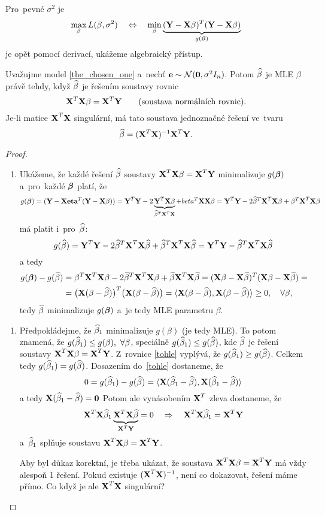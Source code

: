  Pro~pevné $\sigma^2$ je 
 $$\max_\beta L(\beta,\sigma^2)\quad\Leftrightarrow\quad\min_\beta\underbrace{(\textbf{Y}-\textbf{X}\beta)^T(\textbf{Y}-\textbf{X}\beta)}_{g(\boldsymbol{\beta})}$$
 je opět pomocí derivací, ukážeme algebraický přístup.
 
 \begin{theorem}
 	Uvažujme model \ref{the_chosen_one} a~nechť $\textbf{e}\sim\mathcal{N}(\textbf{0},\sigma^2 I_n)$. Potom $\widehat{\beta}$ je MLE $\beta$ právě tehdy, když $\widehat{\beta}$ je řešením soustavy rovnic
 	$$ \textbf{X}^T\textbf{X}\beta=\textbf{X}^T\textbf{Y}\qquad\text{(soustava normálních rovnic)}.$$
 	Je-li matice $\textbf{X}^T\textbf{X}$ singulární, má tato soustava jednoznačné řešení ve~tvaru 
 	$$ \widehat{\beta}=(\textbf{X}^T\textbf{X})^{-1}\textbf{X}^T\textbf{Y}.$$
 	\begin{proof}
 		\begin{enumerate}[$\Leftarrow$]
 			\item Ukážeme, že každé řešení $\widehat{\beta}$ soustavy $\textbf{X}^T\textbf{X}\beta=\textbf{X}^T\textbf{Y}$ minimalizuje $g(\boldsymbol{\beta})$ a~pro~každé $\boldsymbol{\beta}$ platí, že 
 			$$ g(\boldsymbol{\beta})=(\textbf{Y}-\textbf{X}\textbf{eta}^T(\textbf{Y}-\textbf{X}\beta))=\textbf{Y}^T\textbf{Y}-2\underbrace{\textbf{Y}^T\textbf{X}\beta}_{\widehat{\beta}^T\textbf{X}^T\textbf{X}}+beta^T\textbf{X}\textbf{X}\beta=\textbf{Y}^T\textbf{Y}-2\widehat{\beta}^T\textbf{X}^T\textbf{X}\beta+\beta^T\textbf{X}^T\textbf{X}\beta$$
 			má platit i~pro~$\widehat{\beta}$:
 			$$ g(\widehat{\beta})=\textbf{Y}^T\textbf{Y}-2\widehat{\beta}^T\textbf{X}^T\textbf{X}\widehat{\beta}+\widehat{\beta}^T\textbf{X}^T\textbf{X}\widehat{\beta}=\textbf{Y}^T\textbf{Y}-\widehat{\beta}^T\textbf{X}^T\textbf{X}\widehat{\beta}$$
 			a tedy 
 			\begin{align}
 			g(\boldsymbol{\beta})-g(\widehat{\beta})&=\beta^T\textbf{X}^T\textbf{X}\beta-2\widehat{\beta}^T\textbf{X}^T\textbf{X}\beta+\widehat{\beta}\textbf{X}^T\textbf{X}\widehat{\beta}=(\textbf{X}\beta-\textbf{X}\widehat{\beta})^T(\textbf{X}\beta-\textbf{X}\widehat{\beta})=\\&\label{tohle}=\big( \textbf{X}(\beta-\widehat{\beta}) \big)^T\big( \textbf{X}(\beta-\widehat{\beta}) \big)=\langle \textbf{X}(\beta-\widehat{\beta}),\textbf{X}(\beta-\widehat{\beta}) \rangle\geq 0,\quad\forall\beta,
 			\end{align}
 			 tedy $\widehat{\beta}$ minimalizuje $g(\boldsymbol{\beta})$ a~je tedy MLE parametru $\beta$.
 		\end{enumerate}
 	\begin{enumerate}[$\Rightarrow$]
 		\item Předpokládejme, že $\widehat{\beta}_1$ minimalizuje $g(\beta)$ (je tedy MLE). To potom znamená, že $g(\widehat{\beta}_1)\leq g(\beta),~\forall \beta$, speciálně $g(\widehat{\beta}_1)\leq g(\widehat{\beta})$, kde $\widehat{\beta}$ je řešení soustavy $\textbf{X}^T\textbf{X}\beta=\textbf{X}^T\textbf{Y}$. Z~rovnice \ref{tohle} vyplývá, že $g(\widehat{\beta}_1)\geq g(\widehat{\beta})$. Celkem tedy $g(\widehat{\beta}_1)=g(\widehat{\beta})$. Dosazením do~\ref{tohle} dostaneme, že 
 		$$ 0=g(\widehat{\beta}_1)-g(\widehat{\beta})=\langle \textbf{X}(\widehat{\beta}_1-\widehat{\beta}),\textbf{X}(\widehat{\beta}_1-\widehat{\beta}) \rangle$$
 		a tedy $\textbf{X}(\widehat{\beta}_1-\widehat{\beta})=\textbf{0}$ Potom ale vynásobením $\textbf{X}^T$ zleva dostaneme, že 
 		$$ \textbf{X}^T\textbf{X}\widehat{\beta}_1\underbrace{\textbf{X}^T\textbf{X}\widehat{\beta}}_{\textbf{X}^T\textbf{Y}}=0\quad\Rightarrow\quad \textbf{X}^T\textbf{X}\widehat{\beta}_1=\textbf{X}^T\textbf{Y}$$
 		 a~$\widehat{\beta}_1$ splňuje soustavu $\textbf{X}^T\textbf{X}\beta=\textbf{X}^T\textbf{Y}$.
 		 
 		 Aby byl důkaz korektní, je třeba ukázat, že soustava $\textbf{X}^T\textbf{X}\beta=\textbf{X}^T\textbf{Y}$ má vždy alespoň 1 řešení. Pokud existuje $(\textbf{X}^T\textbf{X})^{-1}$, není co dokazovat, řešení máme přímo. Co když je ale $\textbf{X}^T\textbf{X}$ singulární?
 	\end{enumerate}
 	\end{proof}
 \end{theorem}

